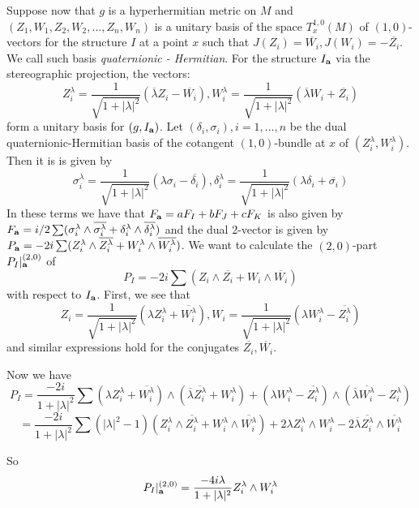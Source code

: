 \documentclass[11pt,oneside,leqno]{amsart}
\theoremstyle{plain}
\theoremstyle{definition}
\begin{document}
Suppose now that $g$ is a hyperhermitian metric on $M$ and $(Z_1, W_1, Z_2, W_2,..., Z_n, W_n)$ is a unitary basis of the space $T_x^{1,0}(M)$ of $(1,0)$-vectors for the structure $I$ at a point $x$  such that $J(Z_i)=\overline{W_i}, J(W_i) = -\overline{Z_i}$. We call such basis {\it quaternionic - Hermitian}.  For the structure $I_{\bf a}$ via the stereographic projection, the vectors:
$$ Z_i^{\lambda} = \frac{1}{\sqrt{1+|\lambda|^2}}(\overline{\lambda}Z_i  - \overline{W_i}), W_i^{\lambda} = \frac{1}{\sqrt{1+|\lambda|^2}}(\overline{\lambda}W_i  + \overline{Z_i})$$
form a unitary basis for $(g,I_{\bf a})$. Let $(\delta_i, \sigma_i),  i=1,...,n$ be the dual quaternionic-Hermitian basis of the cotangent $(1,0)$-bundle at $x$ of $(Z_i^{\lambda}, W_i^{\lambda})$. Then it is  is given by $$\sigma_i^{\lambda} = \frac{1}{\sqrt{1+|\lambda|^2}}(\lambda \sigma_i  - \overline{\delta_i}), \delta_i^{\lambda} = \frac{1}{\sqrt{1+|\lambda|^2}}(\lambda \delta_i  + \overline{\sigma_i})$$
In these terms we have that $F_{\bf a} = aF_I + bF_J  + cF_K$ is also given by $F_{\bf a} = i/2\sum (\sigma_i^{
\lambda}\wedge\overline{\sigma_i^{\lambda}} + \delta_i^{
\lambda}\wedge\overline{\delta_i^{\lambda}})$ and the dual 2-vector is given by $P_{\bf a} = -2i\sum(Z_i^{
\lambda}\wedge\overline{Z_i^{\lambda}} + W_i^{
\lambda}\wedge\overline{W_i^{\lambda}})$. We want to calculate the $(2,0)$-part $P_I|^{(2,0)}_{\bf a}$ of
$$P_I = -2i\sum(Z_i\wedge\overline{Z_i} + W_i\wedge\overline{W_i})
$$
with respect to $I_{\bf a}$. First, we see that
$$Z_i =  \frac{1}{\sqrt{1+|\lambda|^2}}(\lambda Z_i^{\lambda}  + \overline{W_i^{\lambda}}), W_i = \frac{1}{\sqrt{1+|\lambda|^2}}(\lambda W_i^{\lambda}  - \overline{Z_i^{\lambda}})$$ and similar expressions hold for the conjugates $\overline{Z_i}, \overline{W_i}$.

Now we have
$$ P_I = \frac{-2i}{1+|\lambda|^2}\sum (\lambda Z_i^{\lambda}  + \overline{W_i^{\lambda}})\wedge(\overline{\lambda} \overline{Z_i^{\lambda}} + W_i^{\lambda})  + (\lambda W_i^{\lambda}  - \overline{Z_i^{\lambda}})\wedge(\overline{\lambda}\overline{ W_i^{\lambda}}  -  Z_i^{\lambda})
$$
$$ = \frac{-2i}{1+|\lambda|^2}\sum (|\lambda|^2 - 1)(Z_i^{
\lambda}\wedge\overline{Z_i^{\lambda}} + W_i^{
\lambda}\wedge\overline{W_i^{\lambda}}) + 2\lambda Z_i^{\lambda}\wedge W_i^{\lambda} - 2\overline{\lambda}\overline{Z_i^{\lambda}}\wedge \overline{W_i^{\lambda}}
$$

So $$P_I|^{(2,0)}_{\bf a} = \frac{-4i\lambda}{1+|\lambda|^2}Z_i^{\lambda}\wedge W_i^{\lambda}$$
\end{document}
